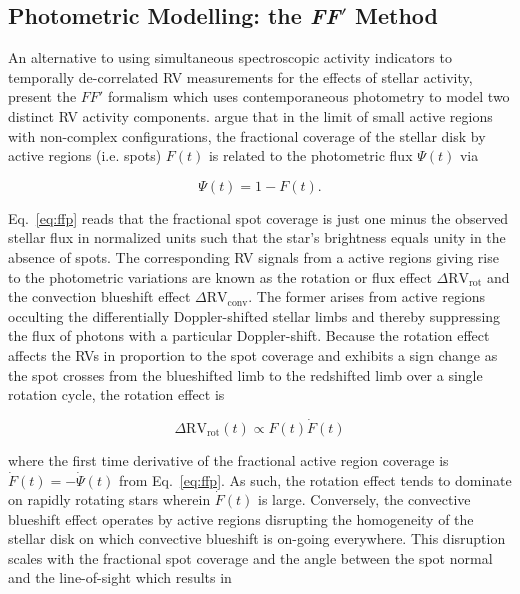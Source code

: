 \subsection{Photometric Modelling: the \textbf{\emph{FF}}$'$ Method} \label{sect:ffp}
An alternative to using simultaneous spectroscopic activity indicators to temporally de-correlated
RV measurements for the effects of stellar activity, \citep{aigrain12} present the $FF'$ formalism
which uses contemporaneous photometry to model two distinct RV activity components. \cite{aigrain12}
argue that in the limit of small active regions with non-complex configurations, the fractional
coverage of the stellar disk by active regions (i.e. spots) $F(t)$ is related to the photometric flux
$\Psi(t)$ via

\begin{equation}
  \Psi(t) = 1 - F(t).
  \label{eq:ffp}
\end{equation}

\noindent Eq.~\ref{eq:ffp} reads that the fractional spot coverage is just one minus the observed
stellar flux in normalized units such that the star's brightness equals unity in the absence of spots.
The corresponding RV signals from a active regions giving rise to the photometric variations are known
as the rotation or flux effect $\Delta \text{RV}_{\text{rot}}$ and the convection blueshift effect
$\Delta \text{RV}_{\text{conv}}$. The former arises from active regions occulting the differentially
Doppler-shifted stellar limbs and thereby suppressing the flux of photons with a particular
Doppler-shift. Because the rotation effect affects the RVs in proportion to the spot coverage and
exhibits a sign change as the spot crosses from the blueshifted limb to the redshifted limb over a single
rotation cycle, the rotation effect is

\begin{equation}
  \Delta \text{RV}_{\text{rot}}(t) \propto F(t) \dot{F}(t)
\end{equation}

\indent where the first time derivative of the fractional active region coverage is
$\dot{F}(t) = -\dot{\Psi}(t)$ from Eq.~\ref{eq:ffp}. As such, the rotation effect tends to dominate
on rapidly rotating stars wherein $\dot{F}(t)$ is large. Conversely, the convective blueshift effect
operates by active regions disrupting the homogeneity of the stellar disk on which convective
blueshift is on-going everywhere. This disruption scales with the fractional spot coverage and
the angle between the spot normal and the line-of-sight which results in

